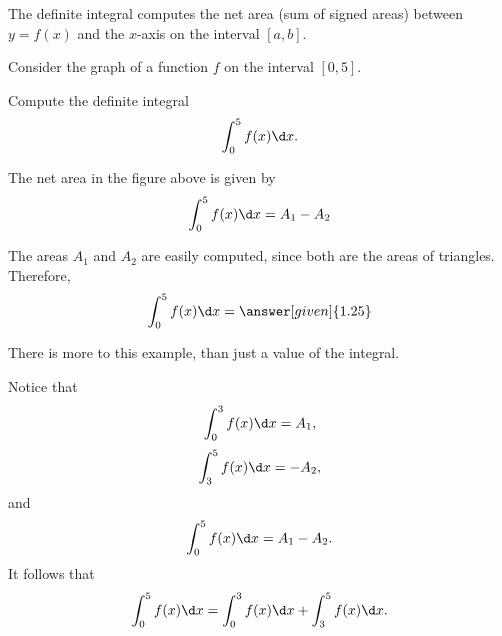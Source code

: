 \documentclass{ximera}
\begin{document}
The definite integral computes the net area (sum of signed areas) between $y=f(x)$ and the $x$-axis on the
interval $[a,b]$.
\begin{question}
Consider the graph of  a function $f$ on the interval $[0,5]$.
\begin{image}
\end{image}
Compute the definite integral
\[
\int_0^5 f(x) \d x.
\]
\begin{explanation}
The net area in the figure above is given by
\[
\int_0^5 f(x) \d x=A_1-A_2
\]
 
The areas $A_1$ and $A_2$ are easily computed, since both are the  areas of triangles. Therefore,
\[
\int_0^5 f(x) \d x=\answer[given]{1.25}
\]
\end{explanation}
\end{question}
There is more to this example, than just a value of the integral.


Notice that 
\[
 \int_0^3 f(x) \d x= A_1,
 \]
 \[
 \int_3^5 f(x) \d x=-A_2,
 \]
and
\[
\int_0^5 f(x) \d x=A_1-A_2.
\]
It follows that
 \[
\int_0^5 f(x) \d x= \int_0^3 f(x) \d x+ \int_3^5 f(x) \d x.
\]
\end{document}
